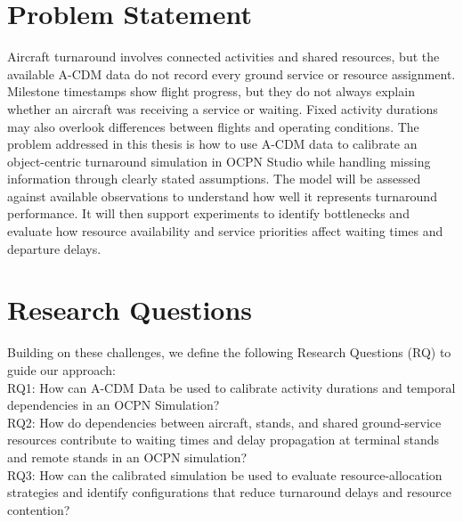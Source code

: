 \section{Problem Statement}

Aircraft turnaround involves connected activities and shared resources, but the available A-CDM data do not record every ground service or resource assignment. Milestone timestamps show flight progress, but they do not always explain whether an aircraft was receiving a service or waiting. Fixed activity durations may also overlook differences between flights and operating conditions. The problem addressed in this thesis is how to use A-CDM data to calibrate an object-centric turnaround simulation in OCPN Studio while handling missing information through clearly stated assumptions. The model will be assessed against available observations to understand how well it represents turnaround performance. It will then support experiments to identify bottlenecks and evaluate how resource availability and service priorities affect waiting times and departure delays.

\section{Research Questions}
Building on these challenges, we define the following Research Questions (RQ) to guide
our approach:\\
RQ1: How can A-CDM Data be used to calibrate activity durations and temporal dependencies in an OCPN Simulation?\\
RQ2: How do dependencies between aircraft, stands, and shared ground-service resources contribute to waiting times and delay propagation at terminal stands and remote stands in an OCPN simulation?\\
RQ3: How can the calibrated simulation be used to evaluate resource-allocation strategies and identify configurations that reduce turnaround delays and resource contention?


